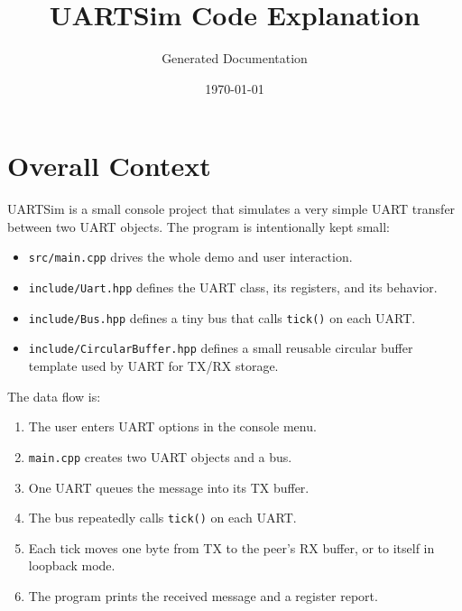 \documentclass[11pt]{article}
\title{UARTSim Code Explanation}
\author{Generated Documentation}
\date{\today}
\newcommand{\file}[1]{\texttt{#1}}
\begin{document}
\maketitle

\section*{Overall Context}
UARTSim is a small console project that simulates a very simple UART transfer between two UART objects. The program is intentionally kept small:
\begin{itemize}[leftmargin=*]
  \item \file{src/main.cpp} drives the whole demo and user interaction.
  \item \file{include/Uart.hpp} defines the UART class, its registers, and its behavior.
  \item \file{include/Bus.hpp} defines a tiny bus that calls \texttt{tick()} on each UART.
  \item \file{include/CircularBuffer.hpp} defines a small reusable circular buffer template used by UART for TX/RX storage.
\end{itemize}

The data flow is:
\begin{enumerate}[leftmargin=*]
  \item The user enters UART options in the console menu.
  \item \texttt{main.cpp} creates two UART objects and a bus.
  \item One UART queues the message into its TX buffer.
  \item The bus repeatedly calls \texttt{tick()} on each UART.
  \item Each tick moves one byte from TX to the peer's RX buffer, or to itself in loopback mode.
  \item The program prints the received message and a register report.
\end{enumerate}
\end{document}
